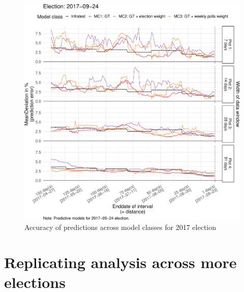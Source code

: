 \documentclass[
  letterpaper,
  DIV=11,
  numbers=noendperiod]{scrartcl}
\begin{document}
\begin{figure}[H]

\caption{\label{fig-A8}Accuracy of predictions across model classes for
2017 election}

{\centering \includegraphics{figures/fig-A8-1.pdf}

}

\end{figure}

\hypertarget{replicating-analysis-across-more-elections}{%
\section{Replicating analysis across more
elections}\label{replicating-analysis-across-more-elections}}
\end{document}
